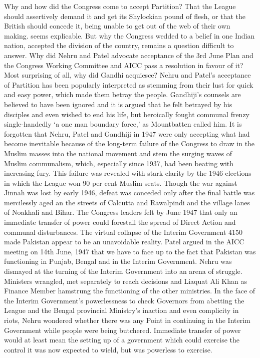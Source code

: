 Why and how did the Congress come to accept Partition? That the League should assertively demand it and get its Shylockian pound of flesh, or that the British should concede it, being unable to get out of the web of their own making. seems explicable. But why the Congress wedded to a belief in one Indian nation, accepted the division of the country, remains a question difficult to answer. Why did Nehru and Patel advocate acceptance of the 3rd June Plan and the Congress Working Committee and AICC pass a resolution in favour of it? Most surprising of all, why did Gandhi acquiesce? Nehru and Patel's acceptance of Partition has been popularly interpreted as stemming from their lust for quick and easy power, which made them betray the people. Gandhiji's counsels are believed to have been ignored and it is argued that he felt betrayed by his disciples and even wished to end his life, but heroically fought communal frenzy single-handedly `a one man boundary force,' as Mountbatten called him. It is forgotten that Nehru, Patel and Gandhiji in 1947 were only accepting what had become inevitable because of the long-term failure of the Congress to draw in the Muslim masses into the national movement and stem the surging waves of Muslim communalism, which, especially since 1937, had been beating with increasing fury. This failure was revealed with stark clarity by the 1946 elections in which the League won 90 per cent Muslim seats. Though the war against Jinnah was lost by early 1946, defeat was conceded only after the final battle was mercilessly aged an the streets of Calcutta and Rawalpindi and the village lanes of Noakhali and Bihar. The Congress leaders felt by June 1947 that only an immediate transfer of power could forestall the spread of Direct Action and communal disturbances. The virtual collapse of the Interim Government 4150 made Pakistan appear to be an unavoidable reality. Patel argued in the AICC meeting on 14th June, 1947 that we have to face up to the fact that Pakistan was functioning in Punjab, Bengal and in the Interim Government. Nehru was dismayed at the turning of the Interim Government into an arena of struggle. Ministers wrangled, met separately to reach decisions and Liaquat Ali Khan as Finance Member hamstrung the functioning of the other ministries. In the face of the Interim Government's powerlessness to check Governors from abetting the League and the Bengal provincial Ministry's inaction and even complicity in riots, Nehru wondered whether there was any Point in continuing in the Interim Government while people were being butchered. Immediate transfer of power would at least mean the setting up of a government which could exercise the control it was now expected to wield, but was powerless to exercise. 

